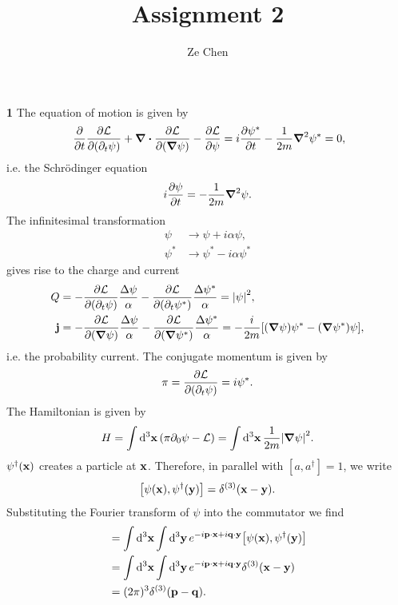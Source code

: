 \documentclass{article}
\title{Assignment 2}
\author{Ze Chen}
\makeatletter
\newcommand*{\shifttext}[1]{%
  \settowidth{\@tempdima}{#1}%
  \hspace{-\@tempdima}#1%
}
\newcommand{\plabel}[1]{%
\shifttext{\textbf{#1}\quad}%
}
\makeatother
\begin{document}
\maketitle

% 
% 

\plabel{1}%
The equation of motion is given by
\begin{align*}
    &\phantom{{}={}} \pdv{}{t}\pdv{\mathcal{L}}{(\partial_t\psi)} + \div \pdv{\mathcal{L}}{(\grad \psi)} - \pdv{\mathcal{L}}{\psi} = i\pdv{\psi^*}{t} - \frac{1}{2m}\grad^2\psi^* = 0,
\end{align*}
i.e. the Schr\"odinger equation
\[ i\pdv{\psi}{t} = -\frac{1}{2m}\grad^2 \psi. \]
The infinitesimal transformation
\begin{align*}
    \psi &\rightarrow \psi + i\alpha\psi, \\
    \psi^* &\rightarrow \psi^* - i\alpha\psi^*
\end{align*}
gives rise to the charge and current
\begin{align*}
    Q &= -\pdv{\mathcal{L}}{(\partial_t \psi)}\frac{\Delta \psi}{\alpha} - \pdv{\mathcal{L}}{(\partial_t \psi^*)}\frac{\Delta \psi^*}{\alpha} = \abs{\psi}^2, \\
    \vb{j} &= -\pdv{\mathcal{L}}{(\grad \psi)}\frac{\Delta \psi}{\alpha} - \pdv{\mathcal{L}}{(\grad \psi^*)}\frac{\Delta \psi^*}{\alpha} = -\frac{i}{2m}\qty[(\grad\psi)\psi^* - (\grad \psi^*)\psi],
\end{align*}
i.e. the probability current.
The conjugate momentum is given by
\[ \pi = \pdv{\mathcal{L}}{(\partial_t \psi)} = i\psi^*. \]
The Hamiltonian is given by
\[ H = \int \dd{^3 \vb{x}} \qty(\pi \partial_0\psi - \mathcal{L}) = \int\dd{^3\vb{x}} \frac{1}{2m}\abs{\grad\psi}^2. \]
$\psi^\dagger(\vb{x})$ creates a particle at $\vb{x}$.
Therefore, in parallel with $[a,a^\dagger] = 1$, we write
\[ \qty[\psi(\vb{x}),\psi^\dagger(\vb{y})] = \delta^{(3)}(\vb{x} - \vb{y}). \]
Substituting the Fourier transform of $\psi$ into the commutator we find
\begin{align*}
    [a_{\vb{p}},a_{\vb{q}}^\dagger] &= \int \dd{^3\vb{x}} \int \dd{^3\vb{y}} e^{-i\vb{p}\cdot \vb{x} + i\vb{q}\cdot\vb{y}}\qty[\psi(\vb{x}),\psi^\dagger(\vb{y})] \\
    &= \int \dd{^3\vb{x}} \int \dd{^3\vb{y}} e^{-i\vb{p}\cdot \vb{x} + i\vb{q}\cdot\vb{y}}\delta^{(3)}(\vb{x} - \vb{y}) \\
    &= (2\pi)^3\delta^{(3)}(\vb{p} - \vb{q}).
\end{align*}
\end{document}
